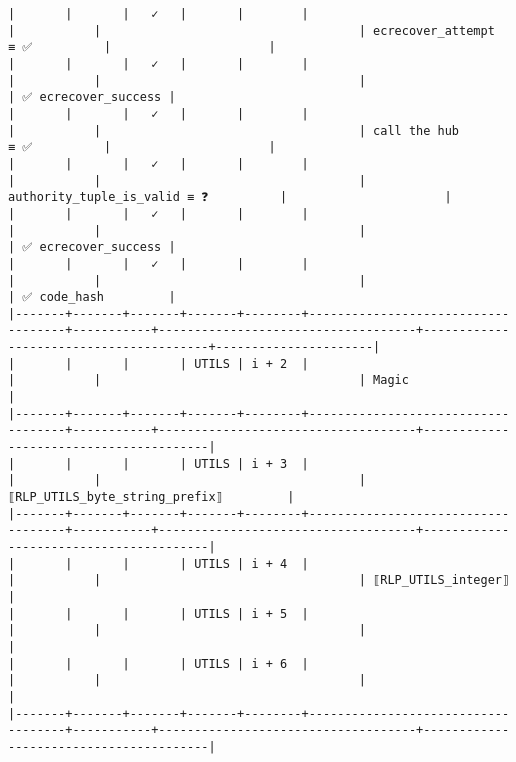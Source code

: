 \documentclass[varwidth=\maxdimen,margin=0.5cm,multi={verbatim}]{standalone}
\begin{document}
\begin{verbatim}
|       |       |   ✓   |       |        |                                    |           |                                    | ecrecover_attempt        ≡ ✅          |                      |
|       |       |   ✓   |       |        |                                    |           |                                    |                                        | ✅ ecrecover_success |
|       |       |   ✓   |       |        |                                    |           |                                    | call the hub             ≡ ✅          |                      |
|       |       |   ✓   |       |        |                                    |           |                                    | authority_tuple_is_valid ≡ ❓          |                      |
|       |       |   ✓   |       |        |                                    |           |                                    |                                        | ✅ ecrecover_success |
|       |       |   ✓   |       |        |                                    |           |                                    |                                        | ✅ code_hash         |
|-------+-------+-------+-------+--------+------------------------------------+-----------+------------------------------------+----------------------------------------+----------------------|
|       |       |       | UTILS | i + 2  |                                    |           |                                    | Magic                                  |
|-------+-------+-------+-------+--------+------------------------------------+-----------+------------------------------------+----------------------------------------|
|       |       |       | UTILS | i + 3  |                                    |           |                                    | ⟦RLP_UTILS_byte_string_prefix⟧         |
|-------+-------+-------+-------+--------+------------------------------------+-----------+------------------------------------+----------------------------------------|
|       |       |       | UTILS | i + 4  |                                    |           |                                    | ⟦RLP_UTILS_integer⟧                    |
|       |       |       | UTILS | i + 5  |                                    |           |                                    |                                        |
|       |       |       | UTILS | i + 6  |                                    |           |                                    |                                        |
|-------+-------+-------+-------+--------+------------------------------------+-----------+------------------------------------+----------------------------------------|

\end{verbatim}
\end{document}
